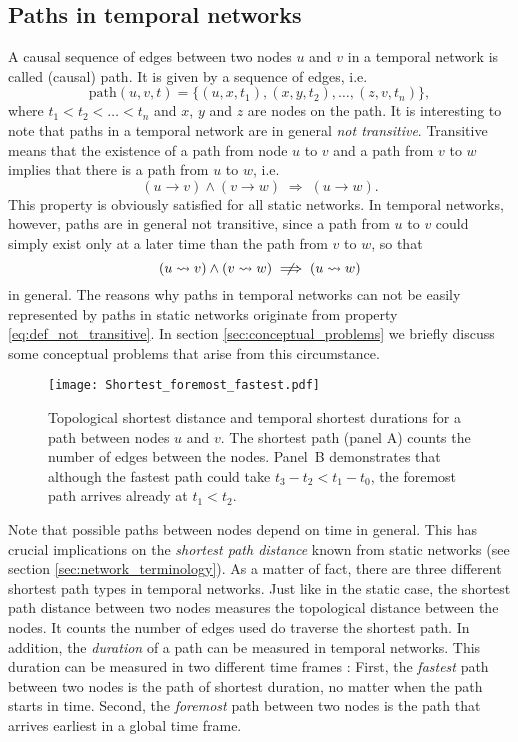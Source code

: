 \subsection{Paths in temporal networks}\label{sec:paths_in_temporal_networks}
A causal sequence of edges between two nodes $u$ and $v$ in a temporal network is called (causal) path.
It is given by a sequence of edges, i.e.
\[
\mathrm{path}(u,v,t)= \{ (u,x,t_1),(x,y,t_2),\dots ,(z,v,t_n) \}, 
\]
where $ t_1<t_2<\dots <t_n$ and $x$, $y$ and $z$ are nodes on the path.
It is interesting to note that paths in a temporal network are in general \emph{not transitive}.
Transitive means that the existence of a path from node $u$ to $v$ and a path from $v$ to $w$ implies that there is a path from $u$ to $w$, i.e.
\begin{equation}\label{eq:def_transitive}
(u\rightarrow v) \wedge (v\rightarrow w) \; \Longrightarrow \; (u\rightarrow w).
\end{equation}
This property is obviously satisfied for all static networks.
In temporal networks, however, paths are in general not transitive, since a path from $u$ to $v$ could simply exist only at a later time than the path from $v$ to $w$, so that
\begin{equation}\label{eq:def_not_transitive}
(u\rightsquigarrow v) \wedge (v\rightsquigarrow w) \;\centernot \Longrightarrow \; (u\rightsquigarrow w)
\end{equation}
in general.
The reasons why paths in temporal networks can not be easily represented by paths in static networks originate from property \eqref{eq:def_not_transitive}.
In section \ref{sec:conceptual_problems} we briefly discuss some conceptual problems that arise from this circumstance.


\begin{SCfigure}
\texttt{[image: Shortest\_foremost\_fastest.pdf]}
\caption{Topological shortest distance and temporal shortest durations for a path between nodes $u$ and $v$.
The shortest path (panel A) counts the number of edges between the nodes.
Panel~B demonstrates that although the fastest path could take $t_3-t_2 < t_1-t_0$, the foremost path arrives already at $t_1<t_2$.
}
\label{fig:shortest_foremost_fastest}
\end{SCfigure}
%
Note that possible paths between nodes depend on time in general.
This has crucial implications on the \emph{shortest path distance} known from static networks (see section  \ref{sec:network_terminology}).
As a matter of fact, there are three different shortest path types in temporal networks.
Just like in the static case, the shortest path distance between two nodes measures the topological distance between the nodes.
It counts the number of edges used do traverse the shortest path.
In addition, the \emph{duration} of a path can be measured in temporal networks.
This duration can be measured in two different time frames \citep{Casteights_review}:
First, the \emph{fastest} path between two nodes is the path of shortest duration, no matter when the path starts in time.
Second, the \emph{foremost} path between two nodes is the path that arrives earliest in a global time frame.

